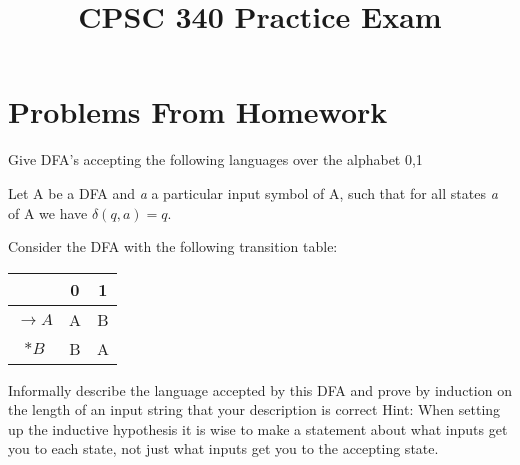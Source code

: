\documentclass{exam}
\begin{document}
\title{CPSC 340 Practice Exam}
\date{}
\maketitle
\vspace{0.1in}
\vspace{0.2in}
\vspace{1cm}

\section*{Problems From Homework}
\begin{questions}
  \question
  Give DFA's accepting the following languages over the alphabet {0,1}

  \question
  Let A be a DFA and \textit{a} a particular input symbol of A, such
  that for all states \textit{a} of A we have $\delta(q, a) = q$.

  \question
  Consider the DFA with the following transition table:
  \begin{center}
    \begin{tabular}{c|c|c}
      &0&1\\
      \hline
      $\rightarrow A$&A&B\\
      $*B$&B&A
    \end{tabular}
  \end{center}
  Informally describe the language accepted by this DFA and prove by
  induction on the length of an input string that your description is
  correct Hint: When setting up the inductive hypothesis it is wise
  to make a statement about what inputs get you to each state, not just
  what inputs get you to the accepting state.


\end{questions}
\end{document}
